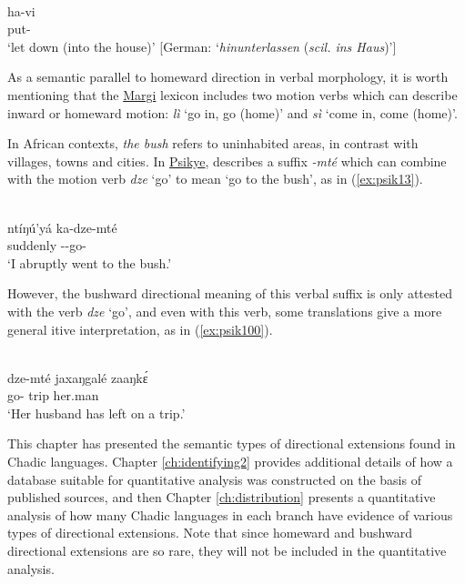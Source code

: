 \ea\label{ex:bura10}
 \\
\gll ha-vi \\ 
put- \\
\glt `let down (into the house)' [German: `\textit{hinunterlassen} (\textit{scil. ins Haus})'] 
\z

As a semantic parallel to homeward direction in verbal morphology, it is worth mentioning that the \hyperref[marg]{Margi} lexicon includes two motion verbs which can describe inward or homeward motion: \textit{lì}  `go in, go (home)' and \textit{sì}  `come in, come (home)'.

In African contexts, \textit{the bush} refers to uninhabited areas, in contrast with villages, towns and cities. In \hyperref[psik]{Psikye}, \citet[118]{smithKapsikiLanguage1969} describes a suffix \textit{-mté} which can combine with the motion verb \textit{dze} `go' to mean `go to the bush', as in (\ref{ex:psik13}). 

\ea\label{ex:psik13}
 \\
\gll ntíŋú'yá ka-dze-mté \\
suddenly --go-	\\
\glt `I abruptly went to the bush.'
\z 

However, the bushward directional meaning of this verbal suffix is only attested with the verb \textit{dze} `go', and even with this verb, some translations give a more general itive interpretation, as in (\ref{ex:psik100}).

\ea\label{ex:psik100}
 \\
\gll dze-mté jaxaŋgalé zaaŋkɛ́	\\
go- trip her.man	\\
\glt `Her husband has left on a trip.'
\z 

This chapter has presented the semantic types of directional extensions found in Chadic languages. Chapter \ref{ch:identifying2} provides additional details of how a database suitable for quantitative analysis was constructed on the basis of published sources, and then Chapter \ref{ch:distribution} presents a quantitative analysis of how many Chadic languages in each branch have evidence of various types of directional extensions. Note that since homeward and bushward directional extensions are so rare, they will not be included in the quantitative analysis. 
